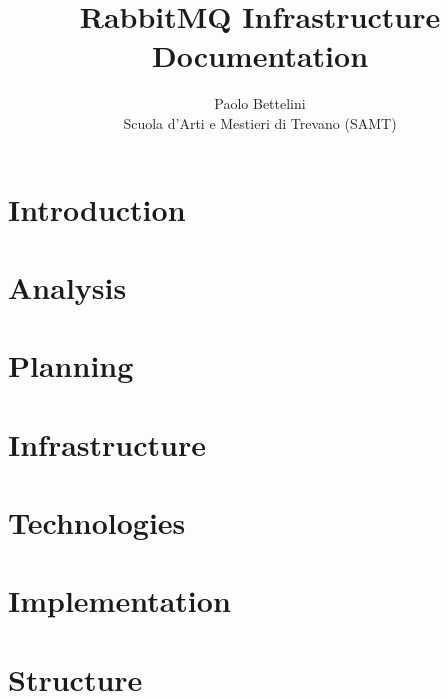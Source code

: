 \documentclass{article}
\title{%
    RabbitMQ Infrastructure \\
    \large Documentation
}
\author{%
    Paolo Bettelini \\
    \large Scuola d'Arti e Mestieri di Trevano (SAMT)}
\date{}
\begin{document}
\maketitle

\pagebreak

\tableofcontents

\pagebreak

\section{Introduction}



\pagebreak

\section{Analysis}



\pagebreak

\section{Planning}



\pagebreak

\section{Infrastructure}



\pagebreak

\section{Technologies}



\pagebreak

\section{Implementation}



\pagebreak

\section{Structure}
\end{document}

